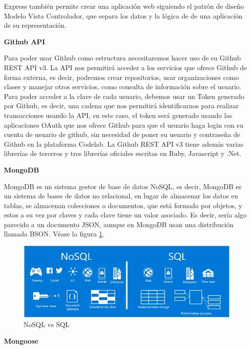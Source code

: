 Express también permite crear una aplicación web siguiendo el patrón de diseño Modelo Vista Controlador, que separa los datos y la lógica de de una aplicación de su representación.

{\bf Github API}

Para poder usar Github como estructura necesitaremos hacer uso de su Github REST API v3. 
La API nos permitirá acceder a los servicios que ofrece Github de forma externa, es decir, podremos crear repositorios, usar organizaciones como clases y manejar otros servicios, como consulta de información sobre el usuario.
Para poder acceder a la clave de cada usuario, debemos usar un Token generado por Github, es decir, una cadena que nos permitirá  identificarnos para realizar transacciones usando la API, en este caso, el token será generado usando las aplicaciones OAuth que nos ofrece Github para que el usuario haga login con su cuenta de usuario de github, sin necesidad de poner su usuario y contraseña de Github en la plataforma Codelab.
La Github REST API v3 tiene además varias librerías de terceros y tres librerías oficiales escritas en Ruby, Javascript y .Net.

{\bf MongoDB}

MongoDB es un sistema gestor de base de datos NoSQL, es decir,
MongoDB es un sistema de bases de datos no relacional, en lugar de
almacenar los datos en tablas, se almacenan colecciones o documentos,
que está formado por objetos, y estos a su vez por claves y cada
clave tiene un valor asociado. Es decir, sería algo parecido a un
documento JSON, aunque en MongoDB usan una distribución llamada
BSON.  Véase la figura \ref{fig:NoSQLvsSQL}.

\begin{figure}[!th]
\begin{center}
\includegraphics[scale=0.5]{images/nosql}
\caption{NoSQL vs SQL}
\label{fig:NoSQLvsSQL}
\end{center}
\end{figure}

{\bf Mongoose}

